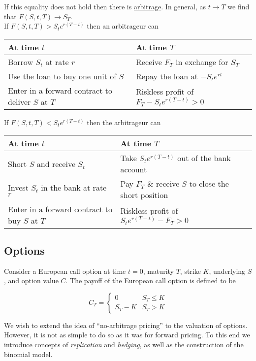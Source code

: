 \documentclass[12pt]{article}
\newlength\tindent
\renewcommand{\indent}{\hspace*{\tindent}}
\begin{document}
\indent If this equality does not hold then there is \underline{arbitrage}. In general, as $t \to T$ we find that $F(S, t, T) \to S_T$. \\

If $F(S, t, T) > S_t e^{r(T - t)}$ then an arbitrageur can

\begin{center}
\begin{tabular}{l|l}
At time $t$ & At time $T$ \\
\hline
Borrow $S_t$ at rate $r$ & Receive $F_T$ in exchange for $S_T$ \\
Use the loan to buy one unit of $S$ & Repay the loan at $-S_te^{rt}$ \\
Enter in a forward contract to deliver $S$ at $T$ & Riskless profit of $F_T - S_te^{r(T - t)} > 0$
\end{tabular}
\end{center}

If $F(S, t, T) < S_t e^{r(T - t)}$ then the arbitrageur can

\begin{center}
\begin{tabular}{l|l}
At time $t$ & At time $T$ \\
\hline
Short $S$ and receive $S_t$ & Take $S_te^{r(T - t)}$ out of the bank account \\
Invest $S_t$ in the bank at rate $r$ & Pay $F_T$ \& receive $S$ to close the short position \\
Enter in a forward contract to buy $S$ at $T$ & Riskless profit of $S_te^{r(T - t)} - F_T > 0$
\end{tabular}
\end{center}

\subsection{Options}

\indent Consider a European call option at time $t = 0$, maturity $T$, strike $K$, underlying $S$, and option value $C$. The payoff of the European call option is defined to be

\begin{equation*}
	C_T =
	\begin{cases}
		0 & S_T \leq K \\
		S_T - K & S_T > K
	\end{cases}
\end{equation*}

\indent We wish to extend the idea of ``no-arbitrage pricing'' to the valuation of options. However, it is not as simple to do so as it was for forward pricing. To this end we introduce concepts of {\em replication} and {\em hedging}, as well as the construction of the binomial model.
\end{document}
